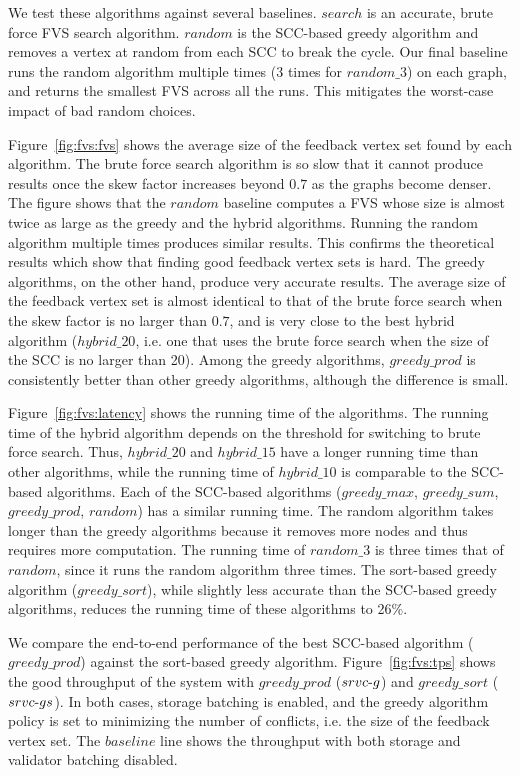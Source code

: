 We test these algorithms against several baselines. $search$ is an accurate, brute force FVS search algorithm. $random$ is the SCC-based greedy algorithm and removes a vertex at random from each SCC to break the cycle. Our final baseline runs the random algorithm multiple times (3 times for $random\_3$) on each graph, and returns the smallest FVS across all the runs. This mitigates the worst-case impact of bad random choices.


Figure~\ref{fig:fvs:fvs} shows the average size of the feedback vertex set found by each algorithm. The brute force search algorithm is so slow that it cannot produce results once the skew factor increases beyond $0.7$ as the graphs become denser.
The figure shows that the $random$ baseline computes a FVS whose size is almost twice as large as the greedy and the hybrid algorithms. Running the random algorithm multiple times produces similar results. This confirms the theoretical results which show that finding good feedback vertex sets is hard. The greedy algorithms, on the other hand, produce very accurate results. The average size of the feedback vertex set is almost identical to that of the brute force search when the skew factor is no larger than $0.7$, and is very close to the best hybrid algorithm ($hybrid\_20$, i.e. one that uses the brute force search when the size of the SCC is no larger than 20). Among the greedy algorithms, $greedy\_prod$ is consistently better than other greedy algorithms, although the difference is small.

Figure~\ref{fig:fvs:latency} shows the running time of the algorithms. The running time of the hybrid algorithm depends on the threshold for switching to brute force search. Thus, $hybrid\_20$ and $hybrid\_15$ have a longer running time than other algorithms, while the running time of $hybrid\_10$ is comparable to the SCC-based algorithms. Each of the SCC-based algorithms ($greedy\_max$, $greedy\_sum$, $greedy\_prod$, $random$) has a similar running time. The random algorithm takes longer than the greedy algorithms because it removes more nodes and thus requires more computation. The running time of $random\_3$ is three times that of $random$, since it runs the random algorithm three times. The sort-based greedy algorithm ($greedy\_sort$), while slightly less accurate than the SCC-based greedy algorithms, reduces the running time of these algorithms to 26\%. 

We compare the end-to-end performance of the best SCC-based algorithm ($greedy\_prod$) against the sort-based greedy algorithm. Figure~\ref{fig:fvs:tps} shows the good throughput of the system with $greedy\_prod$ ($srvc\hbox{-}g$) and $greedy\_sort$ ($srvc\hbox{-}gs$). In both cases, storage batching is enabled, and the greedy algorithm policy is set to minimizing the number of conflicts, i.e. the size of the feedback vertex set. The $baseline$ line shows the throughput with both storage and validator batching disabled. 

